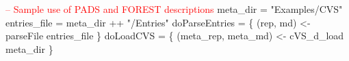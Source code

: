\begin{code}
\textcolor{red}{-- Sample use of PADS and FOREST descriptions}
meta_dir     = "Examples/CVS"
entries_file = meta_dir ++ "/Entries"
doParseEntries =  \{
 (rep, md)  <- parseFile entries_file
\}
\mbox{}             
doLoadCVS =  \{
   (meta_rep, meta_md) <- cVS_d_load meta_dir
\}
\end{code}